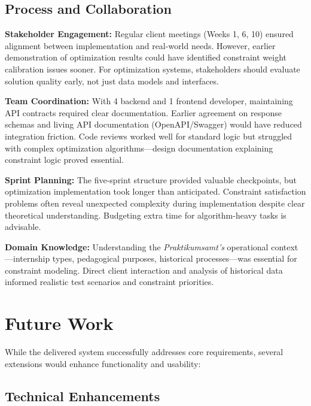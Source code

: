 \documentclass[12pt,a4paper]{report}
\begin{document}
\subsection{Process and Collaboration}

\textbf{Stakeholder Engagement:} Regular client meetings (Weeks 1, 6, 10) ensured alignment between implementation and real-world needs. However, earlier demonstration of optimization results could have identified constraint weight calibration issues sooner. For optimization systems, stakeholders should evaluate solution quality early, not just data models and interfaces.

\textbf{Team Coordination:} With 4 backend and 1 frontend developer, maintaining API contracts required clear documentation. Earlier agreement on response schemas and living API documentation (OpenAPI/Swagger) would have reduced integration friction. Code reviews worked well for standard logic but struggled with complex optimization algorithms—design documentation explaining constraint logic proved essential.

\textbf{Sprint Planning:} The five-sprint structure provided valuable checkpoints, but optimization implementation took longer than anticipated. Constraint satisfaction problems often reveal unexpected complexity during implementation despite clear theoretical understanding. Budgeting extra time for algorithm-heavy tasks is advisable.

\textbf{Domain Knowledge:} Understanding the \textit{Praktikumsamt's} operational context—internship types, pedagogical purposes, historical processes—was essential for constraint modeling. Direct client interaction and analysis of historical data informed realistic test scenarios and constraint priorities.

\section{Future Work}

While the delivered system successfully addresses core requirements, several extensions would enhance functionality and usability:

\subsection{Technical Enhancements}
\end{document}
